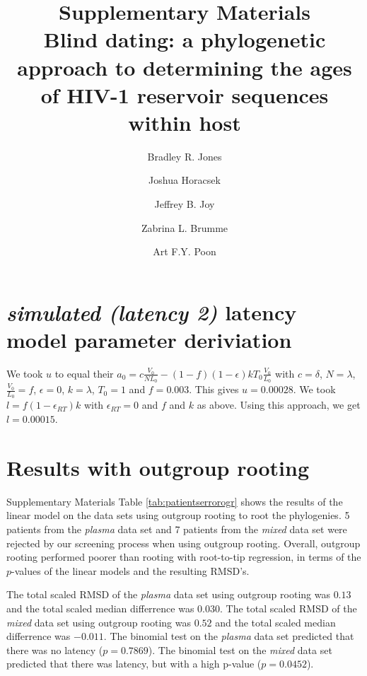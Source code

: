 \documentclass[12pt]{article}
\begin{document}
\title{Supplementary Materials \\ Blind dating: a phylogenetic approach to determining the ages of HIV-1 reservoir sequences within host}

\author[1,2]{Bradley R. Jones}
\author[1,2]{Joshua Horacsek}
\author[2,3]{Jeffrey B. Joy}
\author[1,2]{Zabrina L. Brumme}
\author[1,2,3,*]{Art F.Y. Poon}
\baselineskip 22pt
\pagewiselinenumbers

\date{}
\maketitle

\section{\emph{simulated (latency 2)} latency model parameter deriviation} \label{sec:latencyparams}
We took $u$ to equal their $a_0 = c\frac{V_0}{NL_0}-(1-f)(1-\epsilon)kT_0\frac{V_0}{L_0}$ with $c = \delta$, $N = \lambda$,  $\frac{V_0}{L_0} = f$, $\epsilon = 0$, $k = \lambda$, $T_0 = 1$ and $f = 0.003$.
This gives $u = 0.00028$.
We took $l = f(1-\epsilon_{RT})k$ with $\epsilon_{RT} = 0$ and $f$ and $k$ as above.
Using this approach, we get $l = 0.00015$.

\section{Results with outgroup rooting} \label{sec:ogr}
Supplementary Materials Table \ref{tab:patientserrorogr} shows the results of the linear model on the data sets using outgroup rooting to root the phylogenies.
5 patients from the \emph{plasma} data set and 7 patients from the \emph{mixed} data set were rejected by our screening process when using outgroup rooting.
Overall, outgroup rooting performed poorer than rooting with root-to-tip regression, in terms of the $p$-values of the linear models and the resulting RMSD's.

The total scaled RMSD of the \emph{plasma} data set using outgroup rooting was $0.13$ and the total scaled median differrence was $0.030$.
The total scaled RMSD of the \emph{mixed} data set using outgroup rooting was $0.52$ and the total scaled median differrence was $-0.011$.
The binomial test on the \emph{plasma} data set predicted that there was no latency ($p = 0.7869$).
The binomial test on the \emph{mixed} data set predicted that there was latency, but with a high p-value ($p = 0.0452$).
\end{document}
